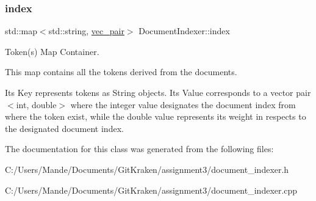 \subsubsection{\texorpdfstring{index}{index}}
{\footnotesize\ttfamily std\+::map$<$std\+::string, \hyperlink{class_document_indexer_a8a84f5e40d9364c31e81627270142628}{vec\+\_\+pair}$>$ Document\+Indexer\+::index\hspace{0.3cm}{\ttfamily [private]}}



Token(s) Map Container. 

This map contains all the tokens derived from the documents.

It\textquotesingle{}s Key represents tokens as String objects. It\textquotesingle{}s Value corresponds to a vector pair $<$int, double$>$ where the integer value designates the document index from where the token exist, while the double value represents its weight in respects to the designated document index. 

The documentation for this class was generated from the following files\+:\begin{DoxyCompactItemize}
\item 
C\+:/\+Users/\+Mande/\+Documents/\+Git\+Kraken/assignment3/document\+\_\+indexer.\+h\item 
C\+:/\+Users/\+Mande/\+Documents/\+Git\+Kraken/assignment3/document\+\_\+indexer.\+cpp\end{DoxyCompactItemize}
